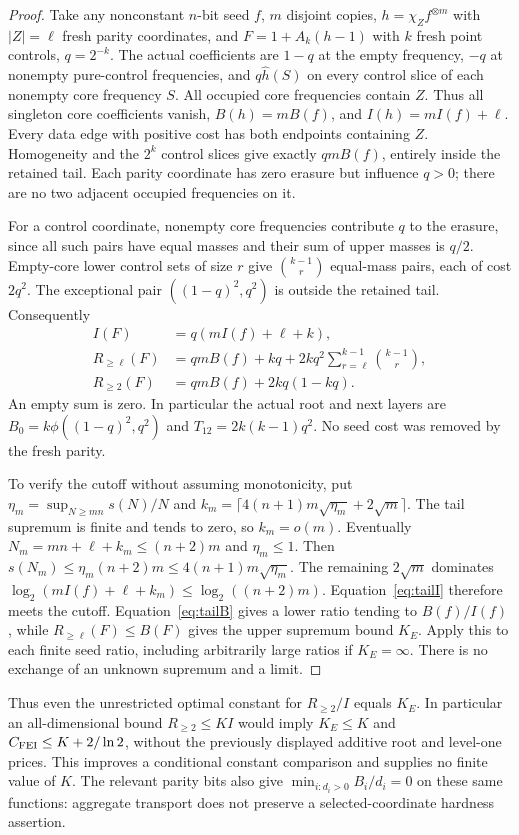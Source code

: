\documentclass[11pt]{article}
\begin{document}
\begin{proof}
Take any nonconstant $n$-bit seed $f$, $m$ disjoint copies,
$h=\chi_Z f^{\otimes m}$ with $|Z|=\ell$ fresh parity coordinates,
and $F=1+A_k(h-1)$ with $k$ fresh point controls, $q=2^{-k}$.
The actual coefficients are $1-q$ at the empty frequency, $-q$ at
nonempty pure-control frequencies, and $q\widehat h(S)$ on every
control slice of each nonempty core frequency $S$.
All occupied core frequencies contain $Z$. Thus all singleton core
coefficients vanish, $B(h)=mB(f)$, and $I(h)=mI(f)+\ell$.
Every data edge with positive cost has both endpoints containing $Z$.
Homogeneity and the $2^k$ control slices give exactly $qmB(f)$,
entirely inside the retained tail. Each parity coordinate has zero erasure
but influence $q>0$; there are no two adjacent occupied frequencies on it.

For a control coordinate, nonempty core frequencies contribute $q$
to the erasure, since all such pairs have equal masses and their sum
of upper masses is $q/2$. Empty-core lower control sets of size $r$
give $\binom{k-1}{r}$ equal-mass pairs, each of cost $2q^2$.
The exceptional pair $((1-q)^2,q^2)$ is outside the retained tail.
Consequently
\begin{align}
I(F)&=q(mI(f)+\ell+k),\label{eq:tailI}\\
R_{\ge\ell}(F)&=qmB(f)+kq+
 2kq^2\sum_{r=\ell}^{k-1}\binom{k-1}{r},\label{eq:tailB}\\
R_{\ge2}(F)&=qmB(f)+2kq(1-kq).\label{eq:tailtwo}
\end{align}
An empty sum is zero. In particular the actual root and next layers are
$B_0=k\phi((1-q)^2,q^2)$ and $T_{12}=2k(k-1)q^2$.
No seed cost was removed by the fresh parity.

To verify the cutoff without assuming monotonicity, put
$\eta_m=\sup_{N\ge mn}s(N)/N$ and
$k_m=\lceil4(n+1)m\sqrt{\eta_m}+2\sqrt m\rceil$.
The tail supremum is finite and tends to zero, so $k_m=o(m)$.
Eventually $N_m=mn+\ell+k_m\le(n+2)m$ and $\eta_m\le1$.
Then $s(N_m)\le\eta_m(n+2)m\le4(n+1)m\sqrt{\eta_m}$.
The remaining $2\sqrt m$ dominates
$\log_2(mI(f)+\ell+k_m)\le\log_2((n+2)m)$.
Equation~\eqref{eq:tailI} therefore meets the cutoff. Equation~\eqref{eq:tailB}
gives a lower ratio tending to $B(f)/I(f)$, while
$R_{\ge\ell}(F)\le B(F)$ gives the upper supremum bound $K_E$.
Apply this to each finite seed ratio, including arbitrarily large ratios
if $K_E=\infty$. There is no exchange of an unknown supremum and a limit.
\end{proof}
Thus even the unrestricted optimal constant for $R_{\ge2}/I$ equals $K_E$.
In particular an all-dimensional bound $R_{\ge2}\le KI$ would imply
$K_E\le K$ and $C_{\rm FEI}\le K+2/\ln2$, without the previously
displayed additive root and level-one prices. This improves a conditional
constant comparison and supplies no finite value of $K$.
The relevant parity bits also give
$\min_{i:d_i>0}B_i/d_i=0$ on these same functions: aggregate transport
does not preserve a selected-coordinate hardness assertion.
\end{document}
